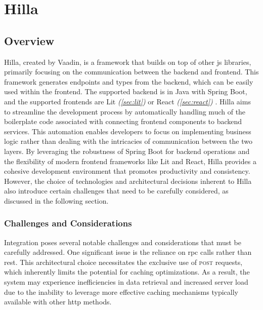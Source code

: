 \section{Hilla}
\label{sec:hilla}

\subsection{Overview}
\label{subsec:hilla:overview}

Hilla, created by Vaadin, is a \gls{framework} that builds on top of other \acrshort{js} libraries, primarily focusing on the communication between the backend and frontend. This \gls{framework} generates endpoints and types from the backend, which can be easily used within the frontend. The supported backend is in Java with Spring Boot, and the supported frontends are Lit \textit{(\ref{sec:lit})} \cite{hilla:lit} or React \textit{(\ref{sec:react})} \cite{hilla:react}. Hilla aims to streamline the development process by automatically handling much of the boilerplate code associated with connecting frontend components to backend services. This automation enables developers to focus on implementing business logic rather than dealing with the intricacies of communication between the two layers. By leveraging the robustness of Spring Boot for backend operations and the flexibility of modern frontend frameworks like Lit and React, Hilla provides a cohesive development environment that promotes productivity and consistency. However, the choice of technologies and architectural decisions inherent to Hilla also introduce certain challenges that need to be carefully considered, as discussed in the following section.

\subsubsection{Challenges and Considerations}
\label{subsec:hilla:challenges}

Integration poses several notable challenges and considerations that must be carefully addressed. One significant issue is the reliance on \acrshort{rpc} calls rather than \acrshort{rest}. This architectural choice necessitates the exclusive use of \textsc{post} requests, which inherently limits the potential for caching optimizations. As a result, the system may experience inefficiencies in data retrieval and increased server load due to the inability to leverage more effective caching mechanisms typically available with other \acrshort{http} methods. \cite{restfulapi:caching,stackoverflow:chrome_cache}

